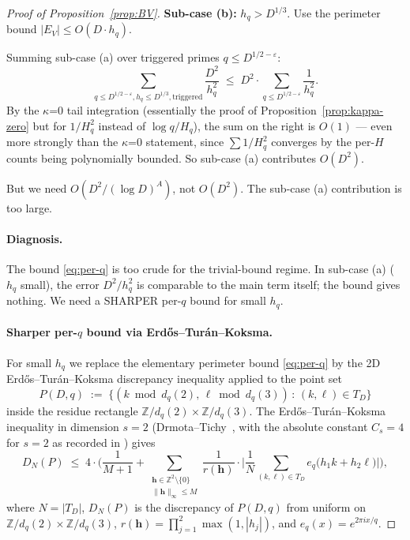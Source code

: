 \begin{proof}[Proof of Proposition~\ref{prop:BV}]
\textbf{Sub-case (b):} $h_{q} > D^{1/3}$. Use the perimeter bound
$|E_{V}| \leq O(D \cdot h_{q})$.

\smallskip

Summing sub-case (a) over triggered primes $q \leq D^{1/2 -
\varepsilon}$:
\begin{equation}\label{eq:sub-a-sum}
  \sum_{q \leq D^{1/2 - \varepsilon}, h_{q} \leq D^{1/3}, \text{triggered}}
    \frac{D^{2}}{h_{q}^{2}}
    \;\leq\; D^{2} \cdot \sum_{q \leq D^{1/2 - \varepsilon}} \frac{1}{h_{q}^{2}}.
\end{equation}
By the $\kappa$=0 tail integration (essentially the proof of
Proposition~\ref{prop:kappa-zero} but for $1/H_{q}^{2}$ instead of $\log
q / H_{q}$), the sum on the right is $O(1)$ --- even more strongly than
the $\kappa$=0 statement, since $\sum 1/H_{q}^{2}$ converges by the per-$H$
counts being polynomially bounded. So sub-case (a) contributes
$O(D^{2})$.

\smallskip

But we need $O(D^{2} / (\log D)^{A})$, not $O(D^{2})$. The sub-case (a)
contribution is too large.

\paragraph{Diagnosis.} The bound \eqref{eq:per-q} is too crude for the
trivial-bound regime. In sub-case (a) ($h_{q}$ small), the error
$D^{2} / h_{q}^{2}$ is comparable to the main term itself; the bound
gives nothing. We need a SHARPER per-$q$ bound for small $h_{q}$.

\paragraph{Sharper per-$q$ bound via Erd\H{o}s--Tur\'an--Koksma.}
For small $h_{q}$ we replace the elementary perimeter bound
\eqref{eq:per-q} by the 2D Erd\H{o}s--Tur\'an--Koksma discrepancy
inequality applied to the point set
\begin{equation}
  P(D, q) \;:=\; \bigl\{ (k \bmod d_{q}(2),\, \ell \bmod d_{q}(3))
    \,:\, (k, \ell) \in T_{D} \bigr\}
\end{equation}
inside the residue rectangle $\mathbb{Z}/d_{q}(2) \times
\mathbb{Z}/d_{q}(3)$. The Erd\H{o}s--Tur\'an--Koksma inequality in
dimension $s = 2$ (Drmota--Tichy~\cite[Thm.~1.21]{DrmotaTichy1997}, with
the absolute constant $C_{s} = 4$ for $s = 2$ as recorded in
\cite[eq.~(1.23) p.~12]{DrmotaTichy1997}) gives
\begin{equation}\label{eq:ETK-2d}
  D_{N}(P) \;\leq\; 4 \cdot \biggl( \frac{1}{M+1}
    + \sum_{\substack{\mathbf{h} \in \mathbb{Z}^{2} \setminus \{0\} \\
       \|\mathbf{h}\|_{\infty} \leq M}}
       \frac{1}{r(\mathbf{h})} \cdot \biggl| \frac{1}{N}
       \sum_{(k, \ell) \in T_{D}} e_{q}\bigl( h_{1} k + h_{2} \ell \bigr) \biggr|
    \biggr),
\end{equation}
where $N = |T_{D}|$, $D_{N}(P)$ is the discrepancy of $P(D, q)$ from
uniform on $\mathbb{Z}/d_{q}(2) \times \mathbb{Z}/d_{q}(3)$,
$r(\mathbf{h}) = \prod_{j=1}^{2} \max(1, |h_{j}|)$, and
$e_{q}(x) = e^{2 \pi i x / q}$.


\end{proof}
